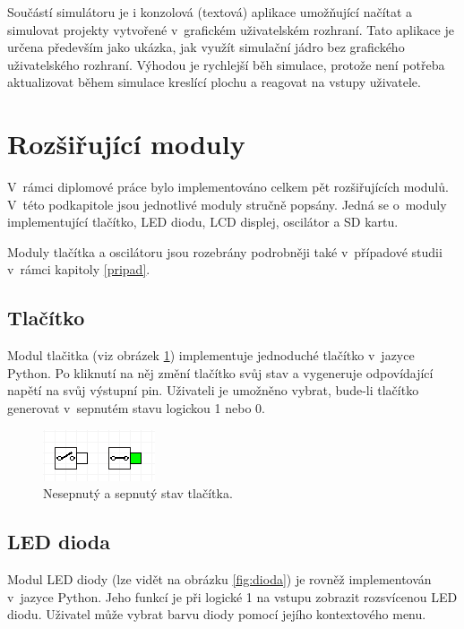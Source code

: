 Součástí simulátoru je i konzolová (textová) aplikace umožňující načítat a simulovat projekty vytvořené v~grafickém uživatelském rozhraní. Tato aplikace je určena především jako ukázka, jak využít simulační jádro bez grafického uživatelského rozhraní. Výhodou je rychlejší běh simulace, protože není potřeba aktualizovat během simulace kreslící plochu a reagovat na vstupy uživatele.

\section{Rozšiřující moduly}

V~rámci diplomové práce bylo implementováno celkem pět rozšiřujících modulů. V~této podkapitole jsou jednotlivé moduly stručně popsány. Jedná se o~moduly implementující tlačítko, LED diodu, LCD displej, oscilátor a SD kartu.

Moduly tlačítka a oscilátoru jsou rozebrány podrobněji také v~případové studii v~rámci kapitoly \ref{pripad}.

\subsection{Tlačítko}

Modul tlačitka (viz obrázek \ref{fig:tlacitko}) implementuje jednoduché tlačítko v~jazyce Python. Po kliknutí na něj změní tlačítko svůj stav a vygeneruje odpovídající napětí na svůj výstupní pin. Uživateli je umožněno vybrat, bude-li tlačítko generovat v~sepnutém stavu logickou 1 nebo 0.

\begin{figure}[ht]
\centering
\includegraphics[trim=0cm 0cm 0cm 0cm, scale=1]{fig/button}
\caption{Nesepnutý a sepnutý stav tlačítka.}
\label{fig:tlacitko}
\end{figure}

\subsection{LED dioda}

Modul LED diody (lze vidět na obrázku \ref{fig:dioda}) je rovněž implementován v~jazyce Python. Jeho funkcí je při logické 1 na vstupu zobrazit rozsvícenou LED diodu. Uživatel může vybrat barvu diody pomocí jejího kontextového menu.


